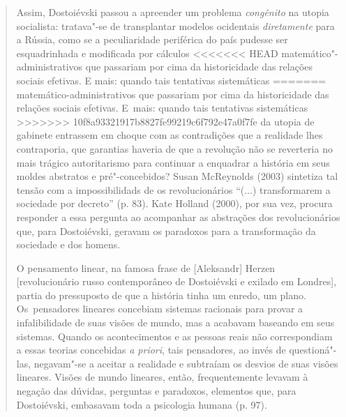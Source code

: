 {\begin{quote}
Assim, Dostoiévski passou a apreender um problema \emph{congênito} na
utopia socialista: tratava"-se de transplantar modelos ocidentais
\emph{diretamente} para a Rússia, como se a peculiaridade periférica do
país pudesse ser esquadrinhada e modificada por cálculos
<<<<<<< HEAD
matemático"-administrativos que passariam por cima da historicidade das
relações sociais efetivas. E mais: quando tais tentativas sistemáticas
=======
matemático-administrativos que passariam por cima da historicidade das
relações sociais efetivas. E~mais: quando tais tentativas sistemáticas
>>>>>>> 10f8a93321917b8827fe99219c6f792e47a0f7fe
da utopia de gabinete entrassem em choque com as contradições que a
realidade lhes contraporia, que garantias haveria de que a revolução não
se reverteria no mais trágico autoritarismo para continuar a enquadrar a
história em seus moldes abstratos e pré"-concebidos? Susan McReynolds
(2003) sintetiza tal tensão com a impossibilidads de os revolucionários
``(...) transformarem a sociedade por decreto'' (p. 83). Kate Holland
(2000), por sua vez, procura responder a essa pergunta ao acompanhar as
abstrações dos revolucionários que, para Dostoiévski, geravam os
paradoxos para a transformação da sociedade e dos homens.

O pensamento linear, na famosa frase de {[}Aleksandr{]} Herzen
{[}revolucionário russo contemporâneo de Dostoiévski e exilado em
Londres{]}, partia do pressuposto de que a história tinha um enredo, um
plano. Os~pensadores lineares concebiam sistemas racionais para provar a
infalibilidade de suas visões de mundo, mas a acabavam baseando em seus
sistemas. Quando os acontecimentos e as pessoas reais não correspondiam
a essas teorias concebidas \emph{a priori}, tais pensadores, ao invés de
questioná"-las, negavam"-se a aceitar a realidade e subtraíam os desvios
de suas visões lineares. Visões de mundo lineares, então, frequentemente
levavam à negação das dúvidas, perguntas e paradoxos, elementos que,
para Dostoiévski, embasavam toda a psicologia humana (p. 97).


\end{quote}}
